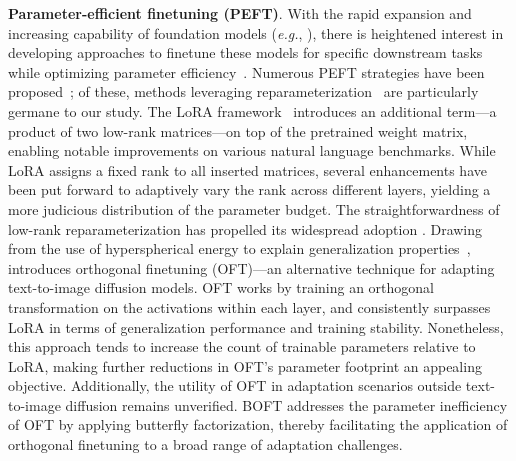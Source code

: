 \textbf{Parameter-efficient finetuning (PEFT)}. With the rapid expansion and increasing capability of foundation models (\emph{e.g.}, \cite{brown2020language,radford2021learning,rombach2022high,kirillov2023segment}), there is heightened interest in developing approaches to finetune these models for specific downstream tasks while optimizing parameter efficiency~\cite{treviso2023efficient,ding2023parameter,lialin2023scaling}. Numerous PEFT strategies have been proposed~\cite{houlsby2019parameter,aghajanyan2020intrinsic,hulora2022,edalati2022krona,wang2022adamix,gheini2021cross,zaken2022bitfit,guo2020parameter,sung2021training,ansell2022composable,lester2021power,li2021prefix,vu2022spot,he2021towards,mao2021unipelt,karimi2021compacter,liu2022few,sung2022lst,chen2022parameter,jia2022visual,chen2022adaptformer,zhang2022neural,jie2023fact,lian2022scaling,luo2023towards}; of these, methods leveraging reparameterization~\cite{aghajanyan2020intrinsic,hulora2022,edalati2022krona} are particularly germane to our study. The LoRA framework~\cite{hulora2022} introduces an additional term—a product of two low-rank matrices—on top of the pretrained weight matrix, enabling notable improvements on various natural language benchmarks. While LoRA assigns a fixed rank to all inserted matrices, several enhancements \cite{zhang2022adaptive,valipour2022dylora,zhang2023increlora} have been put forward to adaptively vary the rank across different layers, yielding a more judicious distribution of the parameter budget. The straightforwardness of low-rank reparameterization has propelled its widespread adoption \cite{dettmers2023qlora,zi2023delta,chavan2023one}. Drawing from the use of hyperspherical energy to explain generalization properties~\cite{liu2018learning,liu2021orthogonal}, \cite{qiu2023controlling} introduces orthogonal finetuning (OFT)—an alternative technique for adapting text-to-image diffusion models. OFT works by training an orthogonal transformation on the activations within each layer, and consistently surpasses LoRA in terms of generalization performance and training stability. Nonetheless, this approach tends to increase the count of trainable parameters relative to LoRA, making further reductions in OFT’s parameter footprint an appealing objective. Additionally, the utility of OFT in adaptation scenarios outside text-to-image diffusion remains unverified. BOFT addresses the parameter inefficiency of OFT by applying butterfly factorization, thereby facilitating the application of orthogonal finetuning to a broad range of adaptation challenges.

